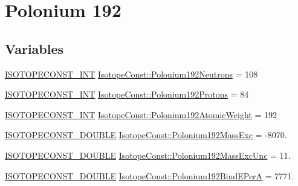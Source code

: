 \hypertarget{group___isotope_const-_polonium-_po192}{}\section{Polonium 192}
\label{group___isotope_const-_polonium-_po192}
\subsection*{Variables}
\begin{DoxyCompactItemize}
\item 
\mbox{\hyperlink{group___isotope_const-_macros_ga5f18360b3e99483a35c32d789e62621c}{I\+S\+O\+T\+O\+P\+E\+C\+O\+N\+S\+T\+\_\+\+I\+NT}} \mbox{\hyperlink{group___isotope_const-_polonium-_po192_ga8487d35c95613da8a144673ae6c28f2a}{Isotope\+Const\+::\+Polonium192\+Neutrons}} = 108
\item 
\mbox{\hyperlink{group___isotope_const-_macros_ga5f18360b3e99483a35c32d789e62621c}{I\+S\+O\+T\+O\+P\+E\+C\+O\+N\+S\+T\+\_\+\+I\+NT}} \mbox{\hyperlink{group___isotope_const-_polonium-_po192_ga5e8026bd331f448b8506d505d7c798e6}{Isotope\+Const\+::\+Polonium192\+Protons}} = 84
\item 
\mbox{\hyperlink{group___isotope_const-_macros_ga5f18360b3e99483a35c32d789e62621c}{I\+S\+O\+T\+O\+P\+E\+C\+O\+N\+S\+T\+\_\+\+I\+NT}} \mbox{\hyperlink{group___isotope_const-_polonium-_po192_ga3b42ce342c53c2e17aa948e4d5635961}{Isotope\+Const\+::\+Polonium192\+Atomic\+Weight}} = 192
\item 
\mbox{\hyperlink{group___isotope_const-_macros_ga8f45a7272ce02c0b4c65c44636ed719a}{I\+S\+O\+T\+O\+P\+E\+C\+O\+N\+S\+T\+\_\+\+D\+O\+U\+B\+LE}} \mbox{\hyperlink{group___isotope_const-_polonium-_po192_ga1db1470a15fe489060b607dfbeaf7432}{Isotope\+Const\+::\+Polonium192\+Mass\+Exc}} = -\/8070.
\item 
\mbox{\hyperlink{group___isotope_const-_macros_ga8f45a7272ce02c0b4c65c44636ed719a}{I\+S\+O\+T\+O\+P\+E\+C\+O\+N\+S\+T\+\_\+\+D\+O\+U\+B\+LE}} \mbox{\hyperlink{group___isotope_const-_polonium-_po192_gaba8f2eac47a0defc93b953c6544805c7}{Isotope\+Const\+::\+Polonium192\+Mass\+Exc\+Unc}} = 11.
\item 
\mbox{\hyperlink{group___isotope_const-_macros_ga8f45a7272ce02c0b4c65c44636ed719a}{I\+S\+O\+T\+O\+P\+E\+C\+O\+N\+S\+T\+\_\+\+D\+O\+U\+B\+LE}} \mbox{\hyperlink{group___isotope_const-_polonium-_po192_gaab0725220c7320ff2af97d6124d36fa5}{Isotope\+Const\+::\+Polonium192\+Bind\+E\+PerA}} = 7771.
\item 

\end{DoxyCompactItemize}
